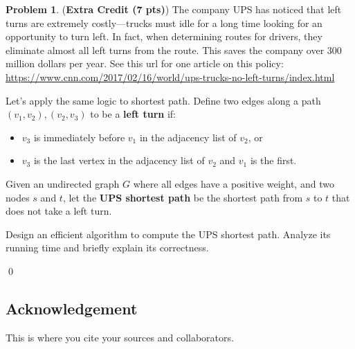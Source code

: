 \documentclass[12pt]{article}
\theoremstyle{definition}
\newtheorem{question}{Problem}
\newenvironment{solution}{\bigskip\noindent{\it Solution.}  \ignorespaces}{\hfill\qed}
\begin{document}
\newpage
\begin{question}({\bf Extra Credit (7 pts)})
  The company UPS has noticed that left turns are extremely costly---trucks must idle for a long time looking for an opportunity to turn left.  In fact, when determining routes for drivers, they eliminate almost all left turns from the route.  This saves the company over 300 million dollars per year.  See this url for one article on this policy: \url{https://www.cnn.com/2017/02/16/world/ups-trucks-no-left-turns/index.html}

  Let's apply the same logic to shortest path.  Define two edges along a path $(v_1,v_2), (v_2, v_3)$ to be a \textbf{left turn} if:
  \begin{itemize}[topsep=0pt,noitemsep]
    \item $v_3$ is immediately before $v_1$ in the adjacency list of $v_2$, or 
    \item $v_3$ is the last vertex in the adjacency list of $v_2$ and $v_1$ is the first.
  \end{itemize}

  Given an undirected graph $G$ where all edges have a positive weight, and two nodes $s$ and $t$, let the \textbf{UPS shortest path} be the shortest path from $s$ to $t$ that does not take a left turn.

  Design an efficient algorithm to compute the {UPS shortest path}.  Analyze its running time and briefly explain its correctness.
\end{question}
\begin{solution}
\end{solution}

\newpage

\subsection*{Acknowledgement}
This is where you cite your sources and collaborators.
\end{document}
